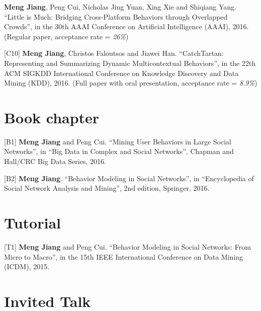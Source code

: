 \documentclass[margin, 10pt]{res} %
\begin{document}
\begin{resume}
[C9] {\bf Meng Jiang}, Peng Cui, Nicholas Jing Yuan, Xing Xie and Shiqiang Yang. ``Little is Much: Bridging Cross-Platform Behaviors through Overlapped Crowds'', in the 30th AAAI Conference on Artificial Intelligence (AAAI), 2016. (Regular paper, acceptance rate = {\em 26\%})

[C10] {\bf Meng Jiang}, Christos Faloutsos and Jiawei Han. ``CatchTartan: Representing and Summarizing Dynamic Multicontextual Behaviors'', in the 22th ACM SIGKDD International Conference on Knowledge Discovery and Data Mining (KDD), 2016. (Full paper with oral presentation, acceptance rate = {\em 8.9\%})


\section{Book chapter}

[B1] {\bf Meng Jiang} and Peng Cui. ``Mining User Behaviors in Large Social Networks'', in ``Big Data in Complex and Social Networks'', Chapman and Hall/CRC Big Data Series, 2016.

[B2] {\bf Meng Jiang}. ``Behavior Modeling in Social Networks'', in ``Encyclopedia of Social Network Analysis and Mining'', 2nd edition, Springer, 2016.


\section{Tutorial}

[T1] {\bf Meng Jiang} and Peng Cui. ``Behavior Modeling in Social Networks: From Micro to Macro'', in the 15th IEEE International Conference on Data Mining (ICDM), 2015.


\section{Invited Talk}


\end{resume}
\end{document}
